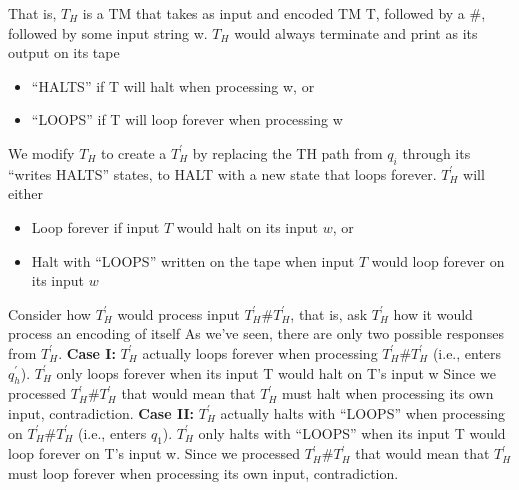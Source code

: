 \documentclass{report}
\begin{document}
\begin{itemize}
            \bigbreak \noindent 
            That is, $T_{H}$ is a TM that takes as input and encoded TM T, followed by a #, followed by some input string w.
            \bigbreak \noindent 
            $T_{H}$ would always terminate and print as its output on its tape
            \begin{itemize}
                \item “HALTS” if T will halt when processing w, or
                \item “LOOPS” if T will loop forever when processing w
            \end{itemize}
            \bigbreak \noindent 
            \bigbreak \noindent 
            We modify $T_{H}$ to create a $T_{H}^{\prime} $ by replacing the TH path from $q_{i}$ through its “writes HALTS” states, to HALT with a new state that loops forever.
            \bigbreak \noindent 
            \bigbreak \noindent 
            $T_{H}^{\prime} $ will either
            \begin{itemize}
                \item Loop forever if input $T$ would halt on its input $w$, or
                \item Halt with “LOOPS” written on the tape when input $T$ would loop forever on its input $w$
            \end{itemize}
            \bigbreak \noindent 
            Consider how $T_{H}^{\prime}$ would process input $T_{H}^{\prime}\#T_{H}^{\prime}$, that is, ask $T_{H}^{\prime}$ how it would process an encoding of itself
            \bigbreak \noindent 
            As we’ve seen, there are only two possible responses from $T_{H}^{\prime} $.
            \bigbreak \noindent 
            \textbf{Case I:} $T_{H}^{\prime} $ actually loops forever when processing $T_{H}^{\prime}\#T_{H}^{\prime}$ (i.e., enters $q_{h}^{\prime} $). $T_{H}^{\prime} $ only loops forever when its input T would halt on T’s input w
            \bigbreak \noindent 
            Since we processed $T_{H}^{\prime}\#T_{H}^{\prime}$ that would mean that $T_{H}^{\prime}$ must halt when processing its own input, contradiction.
            \bigbreak \noindent 
            \textbf{Case II:} $T_{H}^{\prime}$ actually halts with “LOOPS” when processing on $T_{H}^{\prime}\#T_{H}^{\prime} $ (i.e., enters $q_{1}$). 
            $T_{H}^{\prime}$ only halts with “LOOPS” when its input T would loop forever on T’s input w.
            \bigbreak \noindent 
            Since we processed $T_{H}^{\prime}\#T_{H}^{\prime}$ that would mean that $T_{H}^{\prime} $ must loop forever when processing its own input, contradiction.

\end{itemize}
\end{document}
